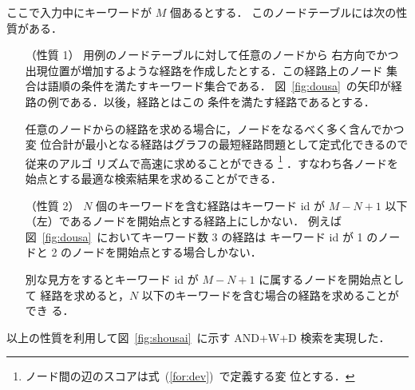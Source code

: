 ここで入力中にキーワードが $M$ 個あるとする．
このノードテーブルには次の性質がある．
\begin{itemize}
  \item [（性質 1）] 用例のノードテーブルに対して任意のノードから
右方向でかつ出現位置が増加するような経路を作成したとする．この経路上のノード
集合は語順の条件を満たすキーワード集合である．
図~\ref{fig:dousa}~の矢印が経路の例である．以後，経路とはこの
条件を満たす経路であるとする．

任意のノードからの経路を求める場合に，ノードをなるべく多く含んでかつ変
位合計が最小となる経路はグラフの最短経路問題として定式化できるので従来のアルゴ
リズムで高速に求めることができる
\footnote{ノード間の辺のスコアは式~(\ref{for:dev})~で定義する変
位とする．}
．すなわち各ノードを始点とする最適な検索結果を求めることができる．
  \item [（性質 2）] $N$ 個のキーワードを含む経路はキーワード id  
が $M-N+1$ 以下（左）であるノードを開始点とする経路上にしかない．
例えば図~\ref{fig:dousa}~においてキーワード数 3 の経路は 
キーワード id が 1  のノードと 2 のノードを開始点とする場合しかない．

別な見方をするとキーワード id が $M-N+1$ に属するノードを開始点として
経路を求めると，$N$ 以下のキーワードを含む場合の経路を求めることができ
る．
\end{itemize}
以上の性質を利用して図~\ref{fig:shousai}~に示す AND+W+D 検索を実現した．
